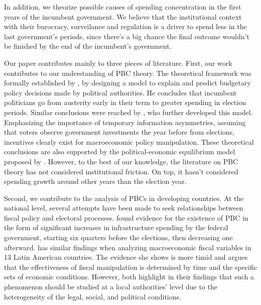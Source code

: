 In addition, we theorize possible causes of spending concentration in the first years of the incumbent government. We believe that the institutional context with their burocracy, surveilance and regulation is a driver to spend less in the last government's periods, since there's a big chance the final outcome wouldn't be finished by the end of the incumbent's government.  

Our paper contributes mainly to three pieces of literature. First, our work contributes to our understanding of PBC theory. The theoretical framework was formally established by \textcite{nordhaus1975}, by designing a model to explain and predict budgetary policy decisions made by political authorities. He concludes that incumbent politicians go from austerity early in their term to greater spending in election periods. Similar conclusions were reached by \textcite{rogoff1988}, who further developed this model. Emphasizing the importance of temporary information asymmetries, assuming that voters observe government investments the year before from elections, incentives clearly exist for macroeconomic policy manipulation. These theoretical conclusions are also supported by the political-economic equilibrium model proposed by \textcite{drazen2010}. However, to the best of our knowledge, the literature on PBC theory has not considered institutional friction. On top, it hasn't considered spending growth around other years than the election year. 

Second, we contribute to the analysis of PBCs in developing countries. At the national level, several attempts have been made to seek relationships between fiscal policy and electoral processes. \textcite{gonzalez2002} found evidence for the existence of PBC in the form of significant increases in infrastructure spending by the federal government, starting six quarters before the elections, then decreasing one afterward. \textcite{lankaster2017} has similar findings when analyzing macroeconomic fiscal variables in 13 Latin American countries. The evidence she shows is more timid and argues that the effectiveness of fiscal manipulation is determined by time and the specific sets of economic conditions. However, both highlight in their findings that such a phenomenon should be studied at a local authorities' level due to the heterogeneity of the legal, social, and political conditions. 

